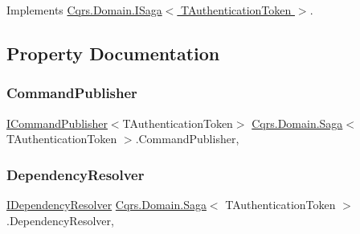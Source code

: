 Implements \hyperlink{interfaceCqrs_1_1Domain_1_1ISaga_a85c75f80bc5be4bad7f1d9f1231bfba7_a85c75f80bc5be4bad7f1d9f1231bfba7}{Cqrs.\+Domain.\+I\+Saga$<$ T\+Authentication\+Token $>$}.



\subsection{Property Documentation}
\mbox{\label{classCqrs_1_1Domain_1_1Saga_a944fc264b716dcd60a2e51c9897766fa_a944fc264b716dcd60a2e51c9897766fa}} 
\subsubsection{\texorpdfstring{Command\+Publisher}{CommandPublisher}}
{\footnotesize\ttfamily \hyperlink{interfaceCqrs_1_1Commands_1_1ICommandPublisher}{I\+Command\+Publisher}$<$T\+Authentication\+Token$>$ \hyperlink{classCqrs_1_1Domain_1_1Saga}{Cqrs.\+Domain.\+Saga}$<$ T\+Authentication\+Token $>$.Command\+Publisher\hspace{0.3cm}{\ttfamily [get]}, {\ttfamily [protected]}}

\mbox{\label{classCqrs_1_1Domain_1_1Saga_afd8b9bae392272e1651f2ea53c65db12_afd8b9bae392272e1651f2ea53c65db12}} 
\subsubsection{\texorpdfstring{Dependency\+Resolver}{DependencyResolver}}
{\footnotesize\ttfamily \hyperlink{interfaceCqrs_1_1Configuration_1_1IDependencyResolver}{I\+Dependency\+Resolver} \hyperlink{classCqrs_1_1Domain_1_1Saga}{Cqrs.\+Domain.\+Saga}$<$ T\+Authentication\+Token $>$.Dependency\+Resolver\hspace{0.3cm}{\ttfamily [get]}, {\ttfamily [protected]}}

\mbox{\label{classCqrs_1_1Domain_1_1Saga_af6b9552a90fcbe5c101c413126256565_af6b9552a90fcbe5c101c413126256565}} 
